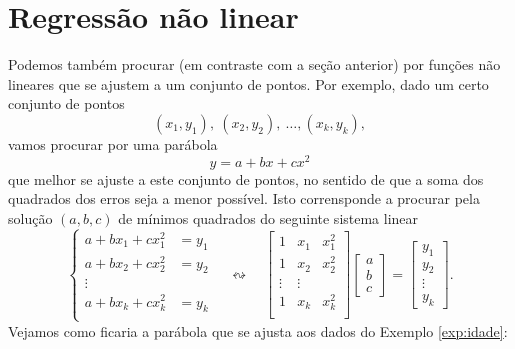 \documentclass[../livro.tex]{subfiles}  %
\begin{document}
\section{Regressão não linear}


Podemos também procurar (em contraste com a seção anterior) por funções não lineares que se ajustem a um conjunto de pontos. Por exemplo, dado um certo conjunto de pontos
\begin{equation}
(x_1, y_1), \ (x_2, y_2), \ \dots, (x_k, y_k),
\end{equation} vamos procurar por uma parábola
\begin{equation}
y = a + bx + cx^2
\end{equation} que melhor se ajuste a este conjunto de pontos, no sentido de que a soma dos quadrados dos erros seja a menor possível. Isto corrensponde a procurar pela solução $(a,b, c)$ de mínimos quadrados do seguinte sistema linear
\begin{equation}
\left\{
  \begin{array}{rl}
    a + b x_1 + c x_1^2 &\!\!\!\!\!= y_1  \\
    a + b x_2 + c x_2^2 &\!\!\!\!\!= y_2  \\
    \vdots &  \\
    a + b x_k + c x_k^2 &\!\!\!\!\!= y_k  \\
  \end{array}
\right. \quad \leftrightsquigarrow  \quad
\begin{bmatrix}
  1 & x_1 & x_1^2 \\
  1 & x_2 & x_2^2 \\
  \vdots & \vdots \\
  1 & x_k & x_k^2 \\
\end{bmatrix}
\begin{bmatrix}
  a \\ b \\ c
\end{bmatrix} =
\begin{bmatrix}
  y_1 \\ y_2 \\ \vdots \\ y_k
\end{bmatrix}.
\end{equation} Vejamos como ficaria a parábola que se ajusta aos dados do Exemplo \ref{exp:idade}:
\end{document}
